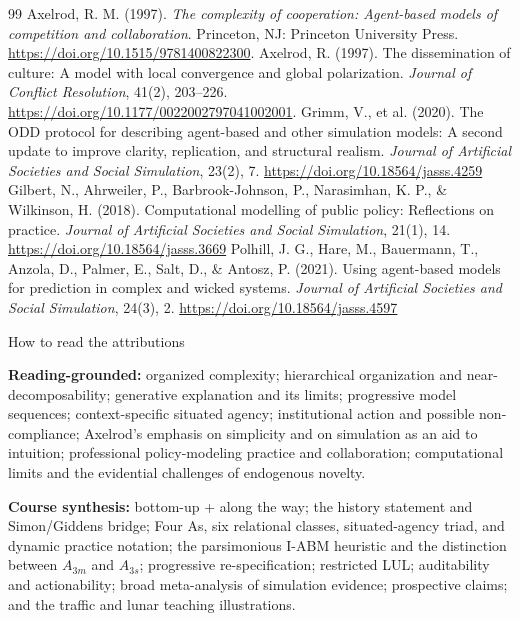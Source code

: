 \documentclass[11pt,a4paper]{article}
\begin{document}
\begin{thebibliography}{99}
 Axelrod, R. M. (1997). \emph{The complexity of cooperation: Agent-based models of competition and collaboration}. Princeton, NJ: Princeton University Press. \url{https://doi.org/10.1515/9781400822300}.
 Axelrod, R. (1997). The dissemination of culture: A model with local convergence and global polarization. \emph{Journal of Conflict Resolution}, 41(2), 203--226. \url{https://doi.org/10.1177/0022002797041002001}.
 Grimm, V., et al. (2020). The ODD protocol for describing agent-based and other simulation models: A second update to improve clarity, replication, and structural realism. \emph{Journal of Artificial Societies and Social Simulation}, 23(2), 7. \url{https://doi.org/10.18564/jasss.4259}
 Gilbert, N., Ahrweiler, P., Barbrook-Johnson, P., Narasimhan, K. P., \& Wilkinson, H. (2018). Computational modelling of public policy: Reflections on practice. \emph{Journal of Artificial Societies and Social Simulation}, 21(1), 14. \url{https://doi.org/10.18564/jasss.3669}
 Polhill, J. G., Hare, M., Bauermann, T., Anzola, D., Palmer, E., Salt, D., \& Antosz, P. (2021). Using agent-based models for prediction in complex and wicked systems. \emph{Journal of Artificial Societies and Social Simulation}, 24(3), 2. \url{https://doi.org/10.18564/jasss.4597}
\end{thebibliography}
\endgroup

\begin{principle}{How to read the attributions}
\raggedright
\textbf{Reading-grounded:} organized complexity; hierarchical organization and near-decomposability; generative explanation and its limits; progressive model sequences; context-specific situated agency; institutional action and possible non-compliance; Axelrod's emphasis on simplicity and on simulation as an aid to intuition; professional policy-modeling practice and collaboration; computational limits and the evidential challenges of endogenous novelty.

\textbf{Course synthesis:} bottom-up + along the way; the history statement and Simon/Giddens bridge; Four As, six relational classes, situated-agency triad, and dynamic practice notation; the parsimonious I-ABM heuristic and the distinction between $A_{3m}$ and $A_{3s}$; progressive re-specification; restricted LUL; auditability and actionability; broad meta-analysis of simulation evidence; prospective claims; and the traffic and lunar teaching illustrations.
\end{principle}
\end{document}

